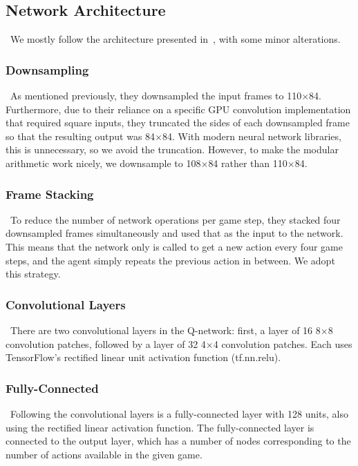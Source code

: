 \documentclass[conference]{IEEEtran}
\begin{document}
\subsection{Network Architecture}
\noindent\ We mostly follow the architecture presented
in~\cite{mnih2013playing}, with some minor alterations.

\subsubsection{Downsampling}
\noindent\ As mentioned previously, they downsampled the input frames to
110$\times$84. Furthermore, due to their reliance on a specific GPU convolution
implementation that required square inputs, they truncated the sides of each
downsampled frame so that the resulting output was 84$\times$84. With modern
neural network libraries, this is unnecessary, so we avoid the truncation.
However, to make the modular arithmetic work nicely, we downsample to
108$\times$84 rather than 110$\times$84.

\subsubsection{Frame Stacking}
\noindent\ To reduce the number of network operations per game step, they
stacked four downsampled frames simultaneously and used that as the input to
the network. This means that the network only is called to get a new action
every four game steps, and the agent simply repeats the previous action in
between. We adopt this strategy.

\subsubsection{Convolutional Layers}
\noindent\ There are two convolutional layers in the Q-network: first, a layer
of 16 8$\times$8 convolution patches, followed by a layer of 32 4$\times$4
convolution patches. Each uses TensorFlow's rectified linear unit activation
function (tf.nn.relu).

\subsubsection{Fully-Connected}
\noindent\ Following the convolutional layers is a fully-connected layer with
128 units, also using the rectified linear activation function. The
fully-connected layer is connected to the output layer, which has a number of
nodes corresponding to the number of actions available in the given game.
\end{document}
